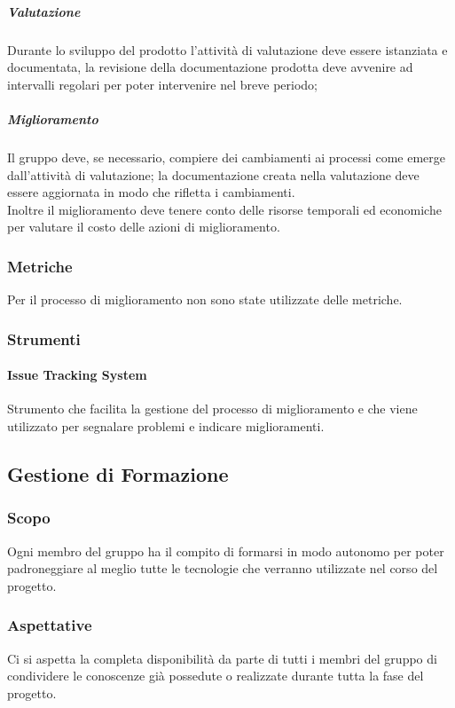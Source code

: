 \subparagraph*{Valutazione} 
Durante lo sviluppo del prodotto l'attività di valutazione deve essere istanziata e documentata, la revisione della documentazione prodotta deve avvenire ad intervalli regolari per poter intervenire nel breve periodo;

\subparagraph*{Miglioramento} 
Il gruppo deve, se necessario, compiere dei cambiamenti ai processi come emerge dall'attività di valutazione; la documentazione creata nella valutazione deve essere aggiornata in modo che rifletta i cambiamenti.\\
Inoltre il miglioramento deve tenere conto delle risorse temporali ed economiche per valutare il costo delle azioni di miglioramento.

\subsubsection{Metriche} 
Per il processo di miglioramento non sono state utilizzate delle metriche.

\subsubsection{Strumenti} 
\paragraph{Issue Tracking System} 
Strumento che facilita la gestione del processo di miglioramento e che viene utilizzato per segnalare problemi e indicare miglioramenti.




\subsection{Gestione di Formazione}
\subsubsection{Scopo}
Ogni membro del gruppo ha il compito di formarsi in modo autonomo per poter padroneggiare al meglio tutte le tecnologie che verranno utilizzate nel corso del progetto.


\subsubsection{Aspettative}
Ci si aspetta la completa disponibilità da parte di tutti i membri del gruppo di condividere le conoscenze già possedute o realizzate durante tutta la fase del progetto.

